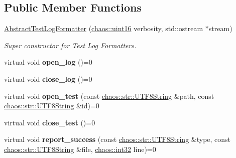 \subsection*{Public Member Functions}
\begin{DoxyCompactItemize}
\item 
\hyperlink{classchaos_1_1test_1_1log__formatter_1_1_abstract_test_log_formatter_a9648fcc43ab62eb051d36da947d68830}{Abstract\-Test\-Log\-Formatter} (\hyperlink{namespacechaos_ac3888b1c9e56da7fbbdb3ab8425b4068}{chaos\-::uint16} verbosity, std\-::ostream $\ast$stream)
\begin{DoxyCompactList}\small\item\em Super constructor for Test Log Formatters. \end{DoxyCompactList}\item 
\hypertarget{classchaos_1_1test_1_1log__formatter_1_1_abstract_test_log_formatter_ae60e3b695f6c2a7e26944c1b0b644136}{virtual void {\bfseries open\-\_\-log} ()=0}\label{classchaos_1_1test_1_1log__formatter_1_1_abstract_test_log_formatter_ae60e3b695f6c2a7e26944c1b0b644136}

\item 
\hypertarget{classchaos_1_1test_1_1log__formatter_1_1_abstract_test_log_formatter_a2884dd5deee2b1f29b971493fdc3bca3}{virtual void {\bfseries close\-\_\-log} ()=0}\label{classchaos_1_1test_1_1log__formatter_1_1_abstract_test_log_formatter_a2884dd5deee2b1f29b971493fdc3bca3}

\item 
\hypertarget{classchaos_1_1test_1_1log__formatter_1_1_abstract_test_log_formatter_a506782a79c28119c9286bcbe6d0df855}{virtual void {\bfseries open\-\_\-test} (const \hyperlink{classchaos_1_1str_1_1_u_t_f8_string}{chaos\-::str\-::\-U\-T\-F8\-String} \&path, const \hyperlink{classchaos_1_1str_1_1_u_t_f8_string}{chaos\-::str\-::\-U\-T\-F8\-String} \&id)=0}\label{classchaos_1_1test_1_1log__formatter_1_1_abstract_test_log_formatter_a506782a79c28119c9286bcbe6d0df855}

\item 
\hypertarget{classchaos_1_1test_1_1log__formatter_1_1_abstract_test_log_formatter_ae88303d5d75855ed7f65fd4e73387704}{virtual void {\bfseries close\-\_\-test} ()=0}\label{classchaos_1_1test_1_1log__formatter_1_1_abstract_test_log_formatter_ae88303d5d75855ed7f65fd4e73387704}

\item 
\hypertarget{classchaos_1_1test_1_1log__formatter_1_1_abstract_test_log_formatter_a76ba5726735b784d05e2d70218270901}{virtual void {\bfseries report\-\_\-success} (const \hyperlink{classchaos_1_1str_1_1_u_t_f8_string}{chaos\-::str\-::\-U\-T\-F8\-String} \&type, const \hyperlink{classchaos_1_1str_1_1_u_t_f8_string}{chaos\-::str\-::\-U\-T\-F8\-String} \&file, \hyperlink{namespacechaos_ad1de7efb430365afd2c9446a0f522a90}{chaos\-::int32} line)=0}\label{classchaos_1_1test_1_1log__formatter_1_1_abstract_test_log_formatter_a76ba5726735b784d05e2d70218270901}


\end{DoxyCompactItemize}
